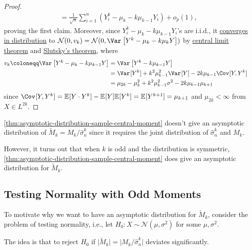 \begin{proof}
\begin{align*}
		 & = \frac{1}{\sqrt{n} } \sum_{i=1}^{n} \left( Y_i^k - \mu _k - k \mu _{k-1} Y_i \right) + o_p(1),
	\end{align*}
	proving the first claim. Moreover, since \(Y_i^k - \mu _k - k \mu _{k-1} Y_i\)'s are i.i.d., it \hyperref[def:converge-in-distribution]{converges in distribution} to \(\mathcal{N} (0, v_k) = \mathcal{N} (0, \Var_{}\left[Y^k - \mu _k - k \mu _k Y\right] )\) by \hyperref[thm:CLT]{central limit theorem} and \hyperref[thm:Slutsky]{Slutsky's theorem}, where
	\[
		\begin{split}
			v_k
			\coloneqq \Var_{}\left[Y^k - \mu _k - k \mu _{k-1} Y\right]
			 & = \Var_{}\left[Y^k - k \mu _{k-1} Y\right]                                      \\
			 & = \Var_{}[Y^k] + k^2 \mu _{k-1}^2 \Var_{}[Y] - 2 k \mu _{k-1} \Cov_{}[Y, Y^k]   \\
			 & = \mu _{2k} - \mu _k^2 + k^2 \mu _{k-1}^2 \sigma ^2 - 2 k \mu _{k-1} \mu _{k+1}
		\end{split}
	\]
	since \(\Cov_{}[Y, Y^k] = \mathbb{E}_{}[Y \cdot Y^k] - \mathbb{E}_{}[Y] \mathbb{E}_{}[Y^k] = \mathbb{E}_{}[Y^{k+1}] = \mu _{k+1}\) and \(\mu _{2k} < \infty \) from \(X \in L^{2k}\).
\end{proof}

\begin{note}
	\autoref{thm:asymptotic-distribution-sample-central-moment} doesn't give an asymptotic distribution of \(\widetilde{M} _k = M_k / \hat{\sigma} _n^k\) since it requires the joint distribution of \(\hat{\sigma} _n^k\) and \(M_k\).
\end{note}

However, it turns out that when \(k\) is odd and the distribution is symmetric, \autoref{thm:asymptotic-distribution-sample-central-moment} does give an asymptotic distribution for \(\widetilde{M} _k\).

\subsection{Testing Normality with Odd Moments}
To motivate why we want to have an asymptotic distribution for \(\widetilde{M} _k\), consider the problem of testing normality, i.e., let \(H_0 \colon X \sim \mathcal{N} (\mu , \sigma ^2)\) for some \(\mu , \sigma ^2\).

\begin{intuition}
	The idea is that to reject \(H_0\) if \(\vert \widetilde{M} _k \vert = \vert M_k / \hat{\sigma} _n^k \vert \) deviates significantly.
\end{intuition}


